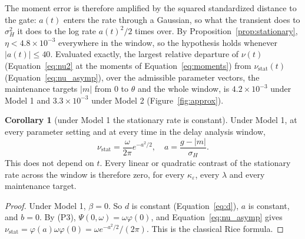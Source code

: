 \documentclass[a4paper,11pt]{article}
\theoremstyle{definition}
\newtheorem{corollary}[proposition]{Corollary}
\newcommand{\nustat}{{\nu }_{\mathrm{stat}}}
\newcommand{\1}{\mathbbm{1}}
\begin{document}
The moment error is therefore amplified by the squared standardized distance to the gate: $a\left(t\right)$ enters the rate through a Gaussian, so what the transient does to ${\sigma }_{H}^{2}$ it does to the log rate ${a\left(t\right)}^{2}/2$ times over. By Proposition~\ref{prop:stationary}, $\eta <4.8\times {10}^{-3}$ everywhere in the window, so the hypothesis holds whenever $|a(t)|\le 40$. Evaluated exactly, the largest relative departure of $\nu \left(t\right)$ (Equation~\eqref{eq:nu2} at the moments of Equation~\eqref{eq:moments}) from $\nustat \left(t\right)$ (Equation~\eqref{eq:nu_asymp}), over the admissible parameter vectors, the maintenance targets $|m|$ from 0 to $\theta$ and the whole window, is $4.2\times {10}^{-3}$ under Model 1 and $3.3\times {10}^{-3}$ under Model 2 (Figure~\ref{fig:approx}).

\begin{corollary}[under Model 1 the stationary rate is constant]\label{cor:flat}
Under Model 1, at every parameter setting and at every time in the delay analysis window,
\begin{equation}
\nustat =\frac{\omega }{2\pi }{e}^{-{a}^{2}/2}, \quad a=\frac{g-\left|m\right|}{{\sigma }_{H}}.
\label{eq:nu1}
\end{equation}
This does not depend on $t$. Every linear or quadratic contrast of the stationary rate across the window is therefore zero, for every $\kappa_{\varepsilon}$, every $\lambda$ and every maintenance target.
\end{corollary}

\begin{proof}
Under Model 1, $\beta=0$. So $d$ is constant (Equation~\eqref{eq:d}), $a$ is constant, and $b=0$. By (P3), $\Psi(0,\omega)=\omega\varphi(0)$, and Equation~\eqref{eq:nu_asymp} gives $\nustat=\varphi(a)\omega\varphi(0)=\omega e^{-a^{2}/2}/(2\pi)$. This is the classical Rice formula.
\end{proof}
\end{document}

